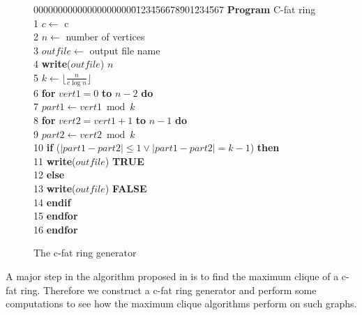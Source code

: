 \begin{figure}
{\footnotesize
\begin{tabbing}
00000000000000000000\=0\=123\=456\=678\=901\=234\=567\= \+ \+ \kill
 \< {\bf Program} C-fat ring \\
 1 \> $c \leftarrow$ c\\
 2 \> $n \leftarrow$ number of vertices \\
 3 \> $outfile \leftarrow$ output file name \\
 4 \> {\bf write}($outfile$)  $n$ \\
 5 \> $k \leftarrow \lfloor \frac{n}{c \log n} \rfloor$ \\
 6 \> {\bf for} $vert1 = 0$ {\bf to} $n-2$ {\bf do}   \\
 7 \> \> $part1 \leftarrow {vert1 \bmod k}$ \\
 8 \> \> {\bf for} $vert2 = vert1+1$ {\bf to} $n-1$ {\bf do} \\
 9 \> \> \> $part2 \leftarrow {vert2 \bmod k}$ \- \\
10 \> \> \> \> {\bf if} ($\left| part1-part2 \right| \leq 1 \vee 
                          \left| part1-part2 \right|= k-1$) {\bf then} \\
11 \> \> \> \> \> {\bf write}($outfile$) {\bf TRUE} \\
12 \> \> \> \> {\bf else} \\
13 \> \> \> \> \> {\bf write}($outfile$) {\bf FALSE} \\
14 \> \> \> \> {\bf endif} \\
15 \> \> \> {\bf endfor} \\
16 \> \> {\bf endfor} \\
\end{tabbing}
}
\caption{The c-fat ring generator}
\label{alg:cfat}
\end{figure}

A major step in the algorithm proposed in
\cite{Ber} is to find the maximum clique of a c-fat ring. Therefore we construct
a c-fat ring generator and perform some computations to see how the maximum
clique algorithms perform on such graphs.

